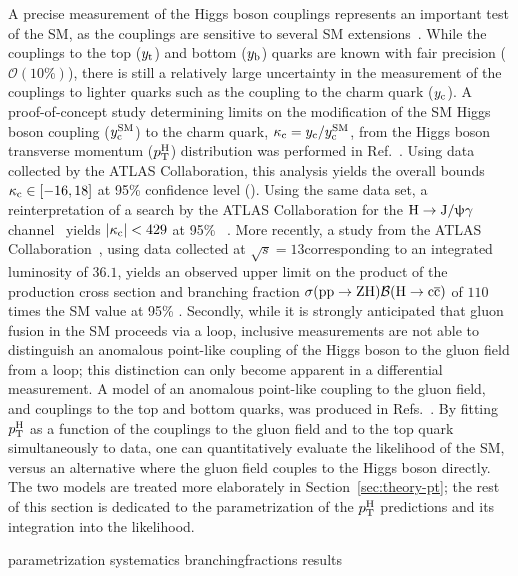 A precise measurement of the Higgs boson couplings represents an important test of the SM, as the couplings are sensitive to several SM extensions~\cite{Dimopoulos:1981zb,Witten:1981nf}.
% 
While the couplings to the top ($y_\mathrm{t}$) and bottom ($y_\mathrm{b}$) quarks are known with fair precision ($\mathcal{O}(10\%)$), there is still a relatively large uncertainty in the measurement of the couplings to lighter quarks such as the coupling to the charm quark ($y_\mathrm{c}$).
% 
A proof-of-concept study determining limits on the modification of the SM Higgs boson coupling ($y_\mathrm{c}^\text{SM}$) to the charm quark, $\kappa_{\mathrm{c}} = y_\mathrm{c} / y_\mathrm{c}^\text{SM}$, from the Higgs boson transverse momentum ($p_\mathrm{T}^\mathrm{H}$) distribution was performed in Ref.~\cite{Bishara:2016jga}.
% 
Using data collected by the ATLAS Collaboration, this analysis yields the overall bounds $\kappa_{\mathrm{c}} \in [ -16, 18 ]$ at 95\% confidence level (\CL).
% 
Using the same data set, a reinterpretation of a search by the ATLAS Collaboration for the $\mathrm{H}\to\mathrm{J}/\uppsi\mathrm{\gamma}$ channel~\cite{Aad:2015sda} yields $\left| \kappa_{\mathrm{c}} \right |<429$ at 95\% \CL~\cite{Koenig:2015pha}.
% 
More recently, a study from the ATLAS Collaboration~\cite{Aaboud:2018fhh}, using data collected at $\sqrt{s}=13$\TeV corresponding to an integrated luminosity of $36.1$\fbinv, yields an observed upper limit on the product of the production cross section and branching fraction $\sigma(\mathrm{p}\mathrm{p}\to\mathrm{Z}\mathrm{H}) \mathcal{B}(\mathrm{H}\to\mathrm{c}\overline{\mathrm{c}})$ of $110$ times the SM value at 95\% \CL.
% 
Secondly, while it is strongly anticipated that gluon fusion in the SM proceeds via a loop, inclusive measurements are not able to distinguish an anomalous point-like coupling of the Higgs boson to the gluon field from a loop; this distinction can only become apparent in a differential measurement.
% 
A model of an anomalous point-like coupling to the gluon field, and couplings to the top and bottom quarks, was produced in Refs.~\cite{Grazzini:2017szg,Grazzini:2016paz}.
% 
By fitting $p_\mathrm{T}^\mathrm{H}$ as a function of the couplings to the gluon field and to the top quark simultaneously to data, one can quantitatively evaluate the likelihood of the SM, versus an alternative where the gluon field couples to the Higgs boson directly.
% 
The two models are treated more elaborately in Section~\ref{sec:theory-pt}; the rest of this section is dedicated to the parametrization of the $p_\mathrm{T}^\mathrm{H}$ predictions and its integration into the likelihood.


{parametrization}
{systematics}
{branchingfractions}
{results}
